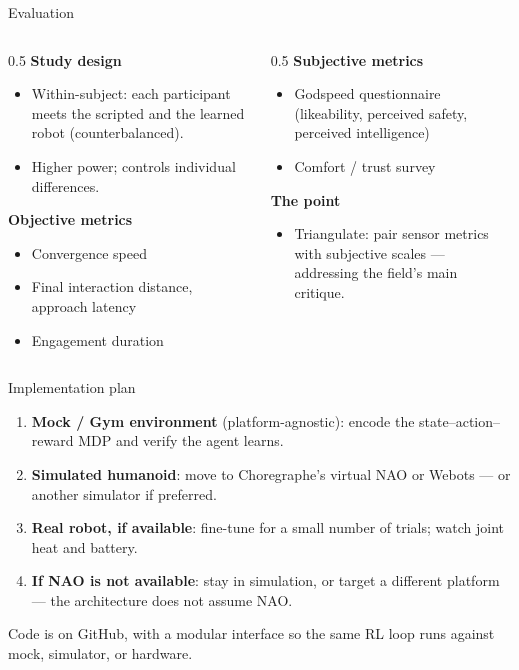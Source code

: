 \documentclass[aspectratio=169,10pt]{beamer}
\begin{document}
\begin{frame}{Evaluation}
  \begin{columns}[T]
    \begin{column}{0.5\textwidth}
      \textbf{Study design}
      \begin{itemize}\footnotesize
        \item Within-subject: each participant meets the scripted and the learned robot (counterbalanced).
        \item Higher power; controls individual differences.
      \end{itemize}
      \textbf{Objective metrics}
      \begin{itemize}\footnotesize
        \item Convergence speed
        \item Final interaction distance, approach latency
        \item Engagement duration
      \end{itemize}
    \end{column}
    \begin{column}{0.5\textwidth}
      \textbf{Subjective metrics}
      \begin{itemize}\footnotesize
        \item Godspeed questionnaire (likeability, perceived safety, perceived intelligence)
        \item Comfort / trust survey
      \end{itemize}
      \textbf{The point}
      \begin{itemize}\footnotesize
        \item Triangulate: pair sensor metrics with subjective scales --- addressing the field's main critique.
      \end{itemize}
    \end{column}
  \end{columns}
\end{frame}

\begin{frame}{Implementation plan}
  \begin{enumerate}
    \item \textbf{Mock / Gym environment} (platform-agnostic): encode the state--action--reward MDP and verify the agent learns.
    \item \textbf{Simulated humanoid}: move to Choregraphe's virtual NAO or Webots --- or another simulator if preferred.
    \item \textbf{Real robot, if available}: fine-tune for a small number of trials; watch joint heat and battery.
    \item \textbf{If NAO is not available}: stay in simulation, or target a different platform --- the architecture does not assume NAO.
  \end{enumerate}
  \vspace{0.3em}
  \begin{block}{}
    \footnotesize Code is on GitHub, with a modular interface so the same RL loop runs against mock, simulator, or hardware.
  \end{block}
\end{frame}
\end{document}
